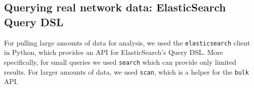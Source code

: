 \documentclass{finalreport}
\begin{document}
\subsection{Querying real network data: ElasticSearch Query DSL}\label{es}

For pulling large amounts of data for analysis, we used the \texttt{elasticsearch}\cite{es} client in Python, which provides an API for ElasticSearch's Query DSL\cite{query}. More specifically, for small queries we used \texttt{search} which can provide only limited results. For larger amounts of data, we used \texttt{scan}, which is a helper for the \texttt{bulk} API.
\end{document}
